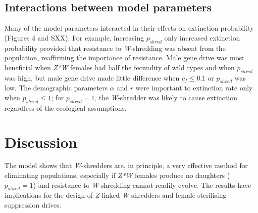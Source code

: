 \documentclass[]{rsos}%
\begin{document}
\hypertarget{interactions-between-model-parameters}{%
\subsection{Interactions between model
parameters}\label{interactions-between-model-parameters}}

Many of the model parameters interacted in their effects on extinction
probability (Figures 4 and SXX). For example, increasing \(p_{shred}\)
only increased extinction probability provided that resistance to
\emph{W}-shredding was absent from the population, reaffirming the
importance of resistance. Male gene drive was most beneficial when
\emph{Z*W} females had half the fecundity of wild types and when
\(p_{shred}\) was high, but male gene drive made little difference when
\(c_f \le 0.1\) or \(p_{shred}\) was low. The demographic parameters
\(\alpha\) and \(r\) were important to extinction rate only when
\(p_{shred} \le 1\); for \(p_{shred} = 1\), the \emph{W}-shredder was
likely to cause extinction regardless of the ecological assumptions.

\hypertarget{discussion}{%
\section{Discussion}\label{discussion}}

The model shows that \emph{W}-shredders are, in principle, a very
effective method for eliminating populations, especially if \emph{Z*W}
females produce no daughters (\(p_{shred} = 1\)) and resistance to
\emph{W}-shredding cannot readily evolve. The results have implications
for the design of \emph{Z}-linked \emph{W}-shredders and
female-sterilising suppression drives.
\end{document}

